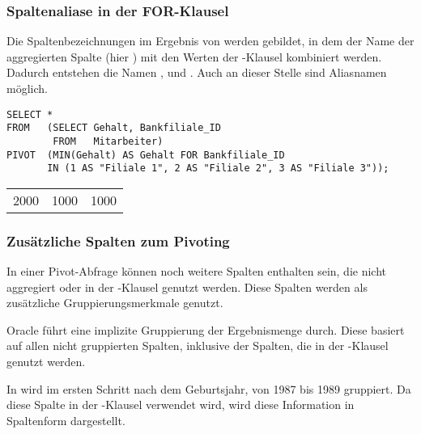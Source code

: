\subsubsection{Spaltenaliase in der FOR-Klausel}
Die Spaltenbezeichnungen im Ergebnis von  werden
gebildet, in dem der Name der aggregierten Spalte (hier
) mit den Werten der -Klausel
kombiniert werden. Dadurch entstehen die Namen ,
 und . Auch an dieser
Stelle sind Aliasnamen möglich.
\begin{lstlisting}[language=oracle_sql,caption={Die \languageorasql{FOR}-Klausel mit Aliasnamen},label=sql06_20]
SELECT *
FROM   (SELECT Gehalt, Bankfiliale_ID
        FROM   Mitarbeiter)
PIVOT  (MIN(Gehalt) AS Gehalt FOR Bankfiliale_ID
       IN (1 AS "Filiale 1", 2 AS "Filiale 2", 3 AS "Filiale 3"));
          \end{lstlisting}
\begin{center}
    \begin{small}
        \tablehead{}
        \begin{oraclesql}
            \begin{supertabular}{rrr}
                2000 & 1000 & 1000 \\
            \end{supertabular}
        \end{oraclesql}
    \end{small}
\end{center}
\subsubsection{Zusätzliche Spalten zum Pivoting}
In einer Pivot-Abfrage können noch weitere Spalten enthalten sein, die nicht aggregiert oder in der -Klausel genutzt werden. Diese Spalten werden als zusätzliche Gruppierungsmerkmale genutzt.
\clearpage
\begin{merke}
    Oracle führt eine implizite Gruppierung der Ergebnismenge durch. Diese basiert auf allen nicht gruppierten Spalten, inklusive der Spalten, die in der -Klausel genutzt werden.
\end{merke}
In  wird im ersten Schritt nach dem Geburtsjahr, von 1987 bis 1989 gruppiert. Da diese Spalte in der -Klausel verwendet wird, wird diese Information in Spaltenform dargestellt.

